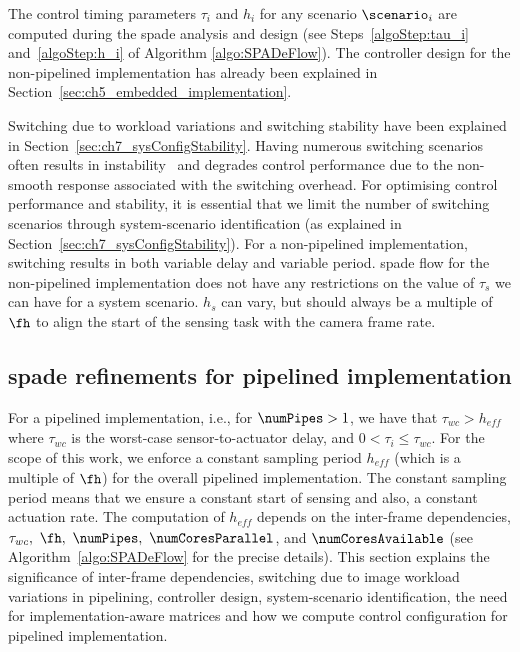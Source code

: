 The control timing parameters $\tau_i$ and $h_i$ for any scenario $\scenario_i$ are computed during the \gls{spade} analysis and design (see Steps~\ref{algoStep:tau_i} and~\ref{algoStep:h_i} of Algorithm \ref{algo:SPADeFlow}).
The controller design for the non-pipelined implementation has already been explained in Section~\ref{sec:ch5_embedded_implementation}.

Switching due to workload variations and  switching stability have been explained in Section~\ref{sec:ch7_sysConfigStability}.
Having numerous switching scenarios often results in instability~\cite{12_sunstability} and degrades control performance due to the non-smooth response associated with the switching overhead.
For optimising control performance and stability, it is essential that we limit the number of switching scenarios through system-scenario identification (as explained in Section~\ref{sec:ch7_sysConfigStability}).
For a non-pipelined implementation, switching results in both variable delay and variable period.
\gls{spade} flow for the non-pipelined implementation does not have any restrictions on the value of $\tau_s$ we can have for a system scenario. $h_s$ can vary, but should always be a multiple of $\fh$ to align the start of the sensing task with the camera frame rate.

\subsection{\texorpdfstring{\Gls{spade}}{SPADe} refinements for pipelined implementation}
\label{sec:ch7_NEW_SPADe_pipelined}
For a pipelined implementation, i.e., for $\numPipes>1$, we have that $\tau_{wc} > h_{\mathit{eff}}$ where $\tau_{wc}$ is the worst-case sensor-to-actuator delay, and $0<\tau_i\le \tau_{wc}$. 
For the scope of this work, we enforce a constant sampling period $h_{\mathit{eff}}$ (which is a multiple of $\fh$) for the overall pipelined implementation. The constant sampling period means that we ensure a constant start of sensing and also, a constant actuation rate. 
The computation of $h_{\mathit{eff}}$ depends on the inter-frame dependencies, $\tau_{wc},\ \fh,\ \numPipes,\ \numCoresParallel$, and $\numCoresAvailable$ (see Algorithm~\ref{algo:SPADeFlow} for the precise details). 
This section explains the significance of inter-frame dependencies, switching due to image workload variations in pipelining, controller design, system-scenario identification, the need for implementation-aware matrices and how we compute control configuration for pipelined implementation.

